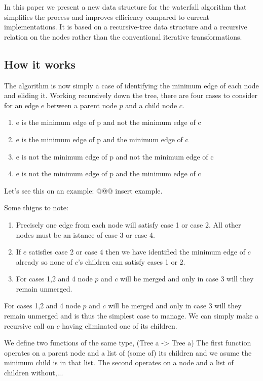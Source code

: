\documentclass{jfp}
\begin{document}
In this paper we present a new data structure for the waterfall
algorithm that simplifies the process and improves efficiency compared
to current implementations. It is based on a recursive-tree data
structure and a recursive relation on the nodes rather than the
conventional iterative transformations.


\subsection{How it works}


The algorithm is now simply a case of identifying the minimum edge
of each node and eliding it. Working recursively down the tree,
there are four cases to consider for an edge $e$ between a parent node
$p$ and a child node $c$.
\begin{enumerate}
\item e is     the minimum edge of p and not the minimum edge of c
\item e is     the minimum edge of p and     the minimum edge of c
\item e is not the minimum edge of p and not the minimum edge of c
\item e is not the minimum edge of p and     the minimum edge of c
\end{enumerate}


Let's see this on an example:
@@@ insert example.


Some thigns to note:
\begin{enumerate}
\item Precisely one edge from each node will satisfy case 1 or case 2. All other nodes must be an istance of case 3 or case 4.
\item If $e$ satisfies case 2 or case 4 then we have identified the minimum edge of $c$ already so none of $c$'s children can satisfy cases 1 or 2.
\item For cases 1,2 and 4 node $p$ and $c$ will be merged and only in case 3 will they remain unmerged.
\end{enumerate}

For cases 1,2 and 4 node $p$ and $c$ will be merged and only in case 3 will they remain unmerged and is thus the simplest case to manage.
We can simply make a recursive call on $c$ having eliminated one of its children.


We define two functions of the same type,  (Tree a -> Tree a)
The first function operates on a parent node and a list of (some of) its children and we asume the minimum child is in that list.
The second operates on a node and a list of children without,...
\end{document}
